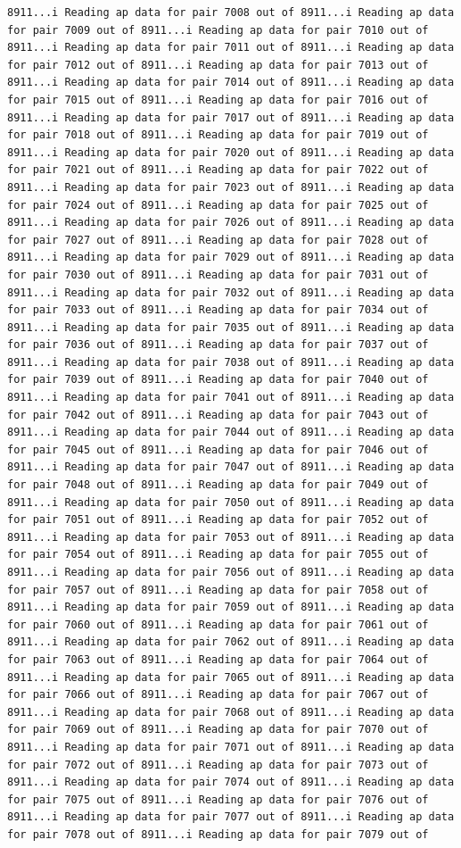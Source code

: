 \documentclass[
]{article}
\begin{document}
\begin{verbatim}
8911...i Reading ap data for pair 7008 out of 8911...i Reading ap data for pair 7009 out of 8911...i Reading ap data for pair 7010 out of 8911...i Reading ap data for pair 7011 out of 8911...i Reading ap data for pair 7012 out of 8911...i Reading ap data for pair 7013 out of 8911...i Reading ap data for pair 7014 out of 8911...i Reading ap data for pair 7015 out of 8911...i Reading ap data for pair 7016 out of 8911...i Reading ap data for pair 7017 out of 8911...i Reading ap data for pair 7018 out of 8911...i Reading ap data for pair 7019 out of 8911...i Reading ap data for pair 7020 out of 8911...i Reading ap data for pair 7021 out of 8911...i Reading ap data for pair 7022 out of 8911...i Reading ap data for pair 7023 out of 8911...i Reading ap data for pair 7024 out of 8911...i Reading ap data for pair 7025 out of 8911...i Reading ap data for pair 7026 out of 8911...i Reading ap data for pair 7027 out of 8911...i Reading ap data for pair 7028 out of 8911...i Reading ap data for pair 7029 out of 8911...i Reading ap data for pair 7030 out of 8911...i Reading ap data for pair 7031 out of 8911...i Reading ap data for pair 7032 out of 8911...i Reading ap data for pair 7033 out of 8911...i Reading ap data for pair 7034 out of 8911...i Reading ap data for pair 7035 out of 8911...i Reading ap data for pair 7036 out of 8911...i Reading ap data for pair 7037 out of 8911...i Reading ap data for pair 7038 out of 8911...i Reading ap data for pair 7039 out of 8911...i Reading ap data for pair 7040 out of 8911...i Reading ap data for pair 7041 out of 8911...i Reading ap data for pair 7042 out of 8911...i Reading ap data for pair 7043 out of 8911...i Reading ap data for pair 7044 out of 8911...i Reading ap data for pair 7045 out of 8911...i Reading ap data for pair 7046 out of 8911...i Reading ap data for pair 7047 out of 8911...i Reading ap data for pair 7048 out of 8911...i Reading ap data for pair 7049 out of 8911...i Reading ap data for pair 7050 out of 8911...i Reading ap data for pair 7051 out of 8911...i Reading ap data for pair 7052 out of 8911...i Reading ap data for pair 7053 out of 8911...i Reading ap data for pair 7054 out of 8911...i Reading ap data for pair 7055 out of 8911...i Reading ap data for pair 7056 out of 8911...i Reading ap data for pair 7057 out of 8911...i Reading ap data for pair 7058 out of 8911...i Reading ap data for pair 7059 out of 8911...i Reading ap data for pair 7060 out of 8911...i Reading ap data for pair 7061 out of 8911...i Reading ap data for pair 7062 out of 8911...i Reading ap data for pair 7063 out of 8911...i Reading ap data for pair 7064 out of 8911...i Reading ap data for pair 7065 out of 8911...i Reading ap data for pair 7066 out of 8911...i Reading ap data for pair 7067 out of 8911...i Reading ap data for pair 7068 out of 8911...i Reading ap data for pair 7069 out of 8911...i Reading ap data for pair 7070 out of 8911...i Reading ap data for pair 7071 out of 8911...i Reading ap data for pair 7072 out of 8911...i Reading ap data for pair 7073 out of 8911...i Reading ap data for pair 7074 out of 8911...i Reading ap data for pair 7075 out of 8911...i Reading ap data for pair 7076 out of 8911...i Reading ap data for pair 7077 out of 8911...i Reading ap data for pair 7078 out of 8911...i Reading ap data for pair 7079 out of 
\end{verbatim}
\end{document}
